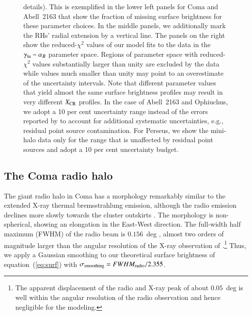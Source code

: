 \documentclass[useAMS,usenatbib]{mn2e}
\begin{document}
\begin{figure}
{  details). This is exemplified in the lower left panels for Coma and Abell~2163
  that show the fraction of missing surface brightness for these parameter
  choices. In the middle panels, we additionally mark the RHs' radial extension
  by a vertical line. The panels on the right show the reduced-$\chi^2$ values
  of our model fits to the data in the $\gamma_{{\mathrm{tu}}}-\alpha_{B}$ parameter
  space.  Regions of parameter space with reduced-$\chi^2$ values substantially
  larger than unity are excluded by the data while values much smaller than
  unity may point to an overestimate of the uncertainty intervals. Note that
  different parameter values that yield almost the same surface brightness
  profiles may result in very different $X_{{\mathrm{CR}}}$ profiles. In the case of
  Abell~2163 and Ophiuchus, we adopt a 10 per cent uncertainty range instead of
  the errors reported by \citet{2009A&A...499..679M} to account for additional
  systematic uncertainties, e.g., residual point source contamination. For
  Perseus, we show the mini-halo data only for the range that is unaffected by
  residual point sources \citep{1990MNRAS.246..477P} and adopt a 10 per cent
  uncertainty budget.}
\label{fig:SBmodeling}
\end{figure}


\subsection{The Coma radio halo}

The giant radio halo in Coma has a morphology remarkably similar to the extended
X-ray thermal bremsstrahlung emission, although the radio emission declines more
slowly towards the cluster outskirts \citep{1992A&A...259L..31B,
  1997A&A...321...55D}. The morphology is non-spherical, showing an elongation
in the East-West direction.  The full-width half maximum (FWHM) of the radio
beam is $0.156$~deg \citep{1997A&A...321...55D}, almost two orders of magnitude
larger than the angular resolution of the X-ray observation of
\cite{1992A&A...259L..31B}.\footnote{The apparent displacement of the radio and
  X-ray peak of about $0.05$~deg is well within the angular resolution of the
  radio observation and hence negligible for the modeling.}  Thus, we apply a
Gaussian smoothing to our theoretical surface brightness of
equation~(\ref{eq:surf}) with $\sigma_{{\mathrm{smoothing}}} =
FWHM_{{\mathrm{radio}}}/2.355$.
\end{document}

